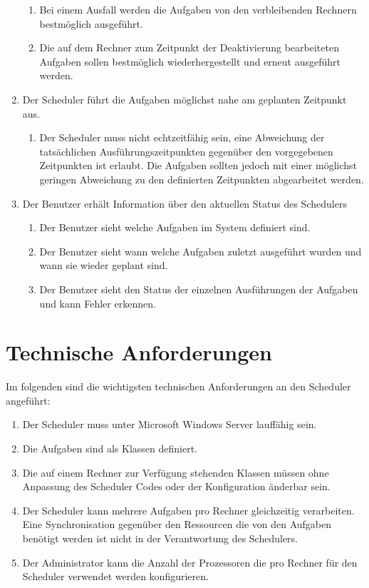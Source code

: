 \begin{enumerate}
\begin{enumerate}
		\item Bei einem Ausfall werden die Aufgaben von den verbleibenden Rechnern bestmöglich ausgeführt.
		\item Die auf dem Rechner zum Zeitpunkt der Deaktivierung bearbeiteten Aufgaben sollen bestmöglich wiederhergestellt und erneut ausgeführt werden.
	\end{enumerate}
	\item Der Scheduler führt die Aufgaben möglichst nahe am geplanten Zeitpunkt aus.
	\begin{enumerate}
		\item Der Scheduler muss nicht echtzeitfähig sein, eine Abweichung der tatsächlichen Ausführungszeitpunkten gegenüber den vorgegebenen Zeitpunkten ist erlaubt. Die Aufgaben sollten jedoch mit einer möglichst geringen Abweichung zu den definierten Zeitpunkten abgearbeitet werden.
	\end{enumerate}
	\item Der Benutzer erhält Information über den aktuellen Status des Schedulers
	\begin{enumerate}
		\item Der Benutzer sieht welche Aufgaben im System definiert sind.
		\item Der Benutzer sieht wann welche Aufgaben zuletzt ausgeführt wurden und wann sie wieder geplant sind.
		\item Der Benutzer sieht den Status der einzelnen Ausführungen der Aufgaben und kann Fehler erkennen.
	\end{enumerate}
\end{enumerate}
\section{Technische Anforderungen}
Im folgenden sind die wichtigsten technischen Anforderungen an den Scheduler angeführt:
\begin{enumerate}
	\item Der Scheduler muss unter Microsoft Windows Server lauffähig sein.
	\item Die Aufgaben sind als Klassen definiert.
	\item Die auf einem Rechner zur Verfügung stehenden Klassen müssen ohne Anpassung des Scheduler Codes oder der Konfiguration änderbar sein.
	\item Der Scheduler kann mehrere Aufgaben pro Rechner gleichzeitig verarbeiten. Eine Synchronisation gegenüber den Ressourcen die von den Aufgaben benötigt werden ist nicht in der Verantwortung des Schedulers.
	\item Der Administrator kann die Anzahl der Prozessoren die pro Rechner für den Scheduler verwendet werden konfigurieren.
\end{enumerate}

\chapterend
